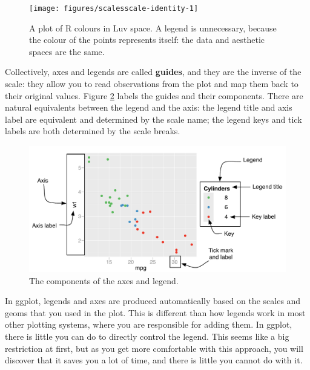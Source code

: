 \begin{figure}

{\centering \texttt{[image: figures/scalesscale-identity-1]} 

}

\caption{A plot of R colours in Luv space.  A legend is unnecessary, because the colour of the points represents itself: the data and aesthetic spaces are the same.\label{fig:scale-identity}}
\end{figure}


Collectively, axes and legends are called \textbf{guides}, and they are
the inverse of the scale: they allow you to read observations from the
plot and map them back to their original values. Figure
\ref{fig:labelled-guides} labels the guides and their components. There
are natural equivalents between the legend and the axis: the legend
title and axis label are equivalent and determined by the scale name;
the legend keys and tick labels are both determined by the scale breaks.

\begin{figure}[htbp]
  \centering
  \includegraphics[width=\linewidth]{diagrams/scale-guides}
  \caption{The components of the axes and legend.}
  \label{fig:labelled-guides}
\end{figure}

In ggplot, legends and axes are produced automatically based on the
scales and geoms that you used in the plot. This is different than how
legends work in most other plotting systems, where you are responsible
for adding them. In ggplot, there is little you can do to directly
control the legend.  This seems like a big restriction at
first, but as you get more comfortable with this approach, you will
discover that it saves you a lot of time, and there is little you cannot
do with it.

